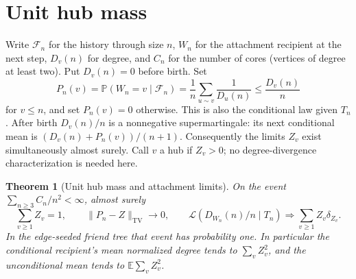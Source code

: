 \documentclass[11pt]{article}
\newtheorem{theorem}{Theorem}
\newcommand{\resulttag}{?}
\newcommand{\tagnext}[1]{\renewcommand{\resulttag}{#1}}
\theoremstyle{remark}
\numberwithin{equation}{section}
\newcommand{\E}{\mathbb E}
\newcommand{\Prob}{\mathbb P}
\begin{document}
\section{Unit hub mass}\label{sec:conservation}
Write $\mathcal F_n$ for the history through size $n$, $W_n$ for the attachment recipient at the next step, $D_v(n)$ for degree, and $C_n$ for the number of cores (vertices of degree at least two). Put $D_v(n)=0$ before birth. Set
\[
 P_n(v)=\Prob(W_n=v\mid\mathcal F_n)=\frac1n\sum_{u\sim v}\frac1{D_u(n)}\le \frac{D_v(n)}n
\]
for $v\le n$, and set $P_n(v)=0$ otherwise. This is also the conditional law given $T_n$. After birth $D_v(n)/n$ is a nonnegative supermartingale: its next conditional mean is $(D_v(n)+P_n(v))/(n+1)$. Consequently the limits $Z_v$ exist simultaneously almost surely. Call $v$ a hub if $Z_v>0$; no degree-divergence characterization is needed here.
\tagnext{MASS}
\begin{theorem}[Unit hub mass and attachment limits]\label{th:hub-mass}
On the event $\sum_{n\ge3} C_n/n^2<\infty$, almost surely
\[
 \sum_{v\ge1} Z_v=1,\qquad
 \|P_n-Z\|_{\mathrm{TV}}\longrightarrow0,\qquad
 \mathcal L(D_{W_n}(n)/n\mid T_n)\Longrightarrow \sum_{v\ge1}Z_v\delta_{Z_v}.
\]
In the edge-seeded friend tree that event has probability one. In particular the conditional recipient's mean normalized degree tends to $\sum_v Z_v^2$, and the unconditional mean tends to $\E\sum_v Z_v^2$.
\end{theorem}
\end{document}
